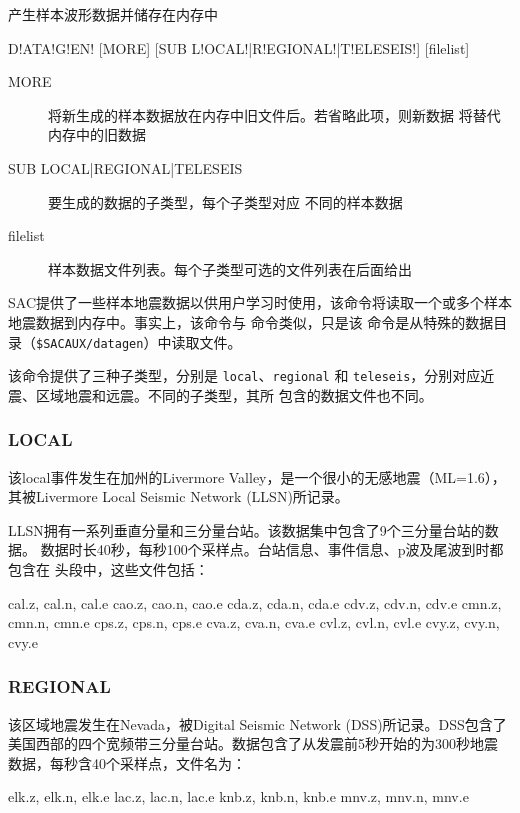 \label{cmd:datagen}

产生样本波形数据并储存在内存中

\begin{SACSTX}
D!ATA!G!EN! [MORE] [SUB L!OCAL!|R!EGIONAL!|T!ELESEIS!] [filelist]
\end{SACSTX}

\begin{description}
\item [MORE] 将新生成的样本数据放在内存中旧文件后。若省略此项，则新数据
    将替代内存中的旧数据
\item [SUB LOCAL|REGIONAL|TELESEIS] 要生成的数据的子类型，每个子类型对应
    不同的样本数据
\item [filelist] 样本数据文件列表。每个子类型可选的文件列表在后面给出
\end{description}

SAC提供了一些样本地震数据以供用户学习时使用，该命令将读取一个或多个样本
地震数据到内存中。事实上，该命令与  命令类似，只是该
命令是从特殊的数据目录（\verb|$SACAUX/datagen|）中读取文件。

该命令提供了三种子类型，分别是 \texttt{local}、\texttt{regional} 和
\texttt{teleseis}，分别对应近震、区域地震和远震。不同的子类型，其所
包含的数据文件也不同。

\subsubsection*{LOCAL}
该local事件发生在加州的Livermore Valley，是一个很小的无感地震（ML=1.6），
其被Livermore Local Seismic Network (LLSN)所记录。

LLSN拥有一系列垂直分量和三分量台站。该数据集中包含了9个三分量台站的数据。
数据时长40秒，每秒100个采样点。台站信息、事件信息、p波及尾波到时都包含在
头段中，这些文件包括：
\begin{SACCode}
    cal.z, cal.n, cal.e
    cao.z, cao.n, cao.e
    cda.z, cda.n, cda.e
    cdv.z, cdv.n, cdv.e
    cmn.z, cmn.n, cmn.e
    cps.z, cps.n, cps.e
    cva.z, cva.n, cva.e
    cvl.z, cvl.n, cvl.e
    cvy.z, cvy.n, cvy.e
\end{SACCode}

\subsubsection*{REGIONAL}
该区域地震发生在Nevada，被Digital Seismic Network (DSS)所记录。DSS包含了
美国西部的四个宽频带三分量台站。数据包含了从发震前5秒开始的为300秒地震
数据，每秒含40个采样点，文件名为：
\begin{SACCode}
    elk.z, elk.n, elk.e
    lac.z, lac.n, lac.e
    knb.z, knb.n, knb.e
    mnv.z, mnv.n, mnv.e
\end{SACCode}

